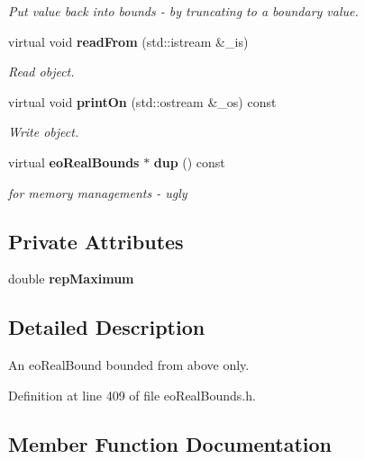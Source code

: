 \begin{CompactItemize}
\begin{CompactList}\small\item\em Put value back into bounds - by truncating to a boundary value. \item\end{CompactList}\item 
virtual void {\bf read\-From} (std::istream \&\_\-is)
\begin{CompactList}\small\item\em Read object. \item\end{CompactList}\item 
virtual void {\bf print\-On} (std::ostream \&\_\-os) const 
\begin{CompactList}\small\item\em Write object. \item\end{CompactList}\item 
virtual {\bf eo\-Real\-Bounds} $\ast$ {\bf dup} () const \label{classeo_real_above_bound_a15}

\begin{CompactList}\small\item\em for memory managements - ugly \item\end{CompactList}\end{CompactItemize}
\subsection*{Private Attributes}
\begin{CompactItemize}
\item 
double {\bf rep\-Maximum}\label{classeo_real_above_bound_r0}

\end{CompactItemize}


\subsection{Detailed Description}
An eo\-Real\-Bound bounded from above only. 



Definition at line 409 of file eo\-Real\-Bounds.h.

\subsection{Member Function Documentation}
